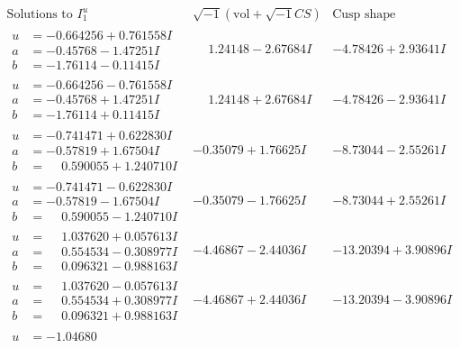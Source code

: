 \documentclass[1p]{elsarticle_modified}
\theoremstyle{definition}
\newcommand{\I}{\sqrt{-1}}
\begin{document}
$$\begin{array}{c|c|c}  
\text{Solutions to }I^u_{1}& \I (\text{vol} + \sqrt{-1}CS) & \text{Cusp shape}\\
 \hline 
\begin{aligned}
u &= -0.664256 + 0.761558 I \\
a &= -0.45768 - 1.47251 I \\
b &= -1.76114 - 0.11415 I\end{aligned}
 & \phantom{-}1.24148 - 2.67684 I & -4.78426 + 2.93641 I \\ \hline\begin{aligned}
u &= -0.664256 - 0.761558 I \\
a &= -0.45768 + 1.47251 I \\
b &= -1.76114 + 0.11415 I\end{aligned}
 & \phantom{-}1.24148 + 2.67684 I & -4.78426 - 2.93641 I \\ \hline\begin{aligned}
u &= -0.741471 + 0.622830 I \\
a &= -0.57819 + 1.67504 I \\
b &= \phantom{-}0.590055 + 1.240710 I\end{aligned}
 & -0.35079 + 1.76625 I & -8.73044 - 2.55261 I \\ \hline\begin{aligned}
u &= -0.741471 - 0.622830 I \\
a &= -0.57819 - 1.67504 I \\
b &= \phantom{-}0.590055 - 1.240710 I\end{aligned}
 & -0.35079 - 1.76625 I & -8.73044 + 2.55261 I \\ \hline\begin{aligned}
u &= \phantom{-}1.037620 + 0.057613 I \\
a &= \phantom{-}0.554534 - 0.308977 I \\
b &= \phantom{-}0.096321 - 0.988163 I\end{aligned}
 & -4.46867 - 2.44036 I & -13.20394 + 3.90896 I \\ \hline\begin{aligned}
u &= \phantom{-}1.037620 - 0.057613 I \\
a &= \phantom{-}0.554534 + 0.308977 I \\
b &= \phantom{-}0.096321 + 0.988163 I\end{aligned}
 & -4.46867 + 2.44036 I & -13.20394 - 3.90896 I \\ \hline\begin{aligned}
u &= -1.04680\phantom{ +0.000000I} \\

\end{aligned}
\end{array}$$
\end{document}

